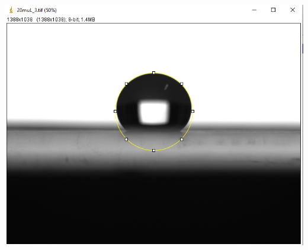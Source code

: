 \documentclass[xcolor=table]{beamer}
\begin{document}
\begin{frame}
\begin{columns}
\begin{column}{.5\textwidth}
\includegraphics[width=0.8\columnwidth]{20muL.PNG}\\

\end{column}
\end{columns}
\end{frame}

\end{document}
